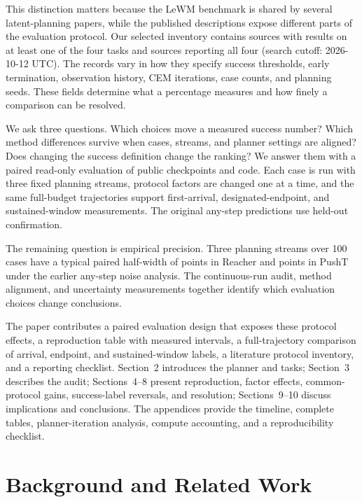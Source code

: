 \documentclass[manuscript,screen,review]{jair}
\begin{document}
This distinction matters because the LeWM benchmark is shared by several latent-planning papers, while the published descriptions expose different parts of the evaluation protocol. Our selected inventory contains \PublicSourceCount{} sources with results on at least one of the four tasks and \FourTaskSourceCount{} sources reporting all four (search cutoff: 2026-10-12 UTC). The records vary in how they specify success thresholds, early termination, observation history, CEM iterations, case counts, and planning seeds. These fields determine what a percentage measures and how finely a comparison can be resolved.

We ask three questions. Which choices move a measured success number? Which method differences survive when cases, streams, and planner settings are aligned? Does changing the success definition change the ranking? We answer them with a paired read-only evaluation of public checkpoints and code. Each case is run with three fixed planning streams, protocol factors are changed one at a time, and the same full-budget trajectories support first-arrival, designated-endpoint, and sustained-window measurements. The original any-step predictions use held-out confirmation.

The remaining question is empirical precision. Three planning streams over 100 cases have a typical paired half-width of \ReacherNoiseHalfwidth{} points in Reacher and \PushTNoiseHalfwidth{} points in PushT under the earlier any-step noise analysis. The continuous-run audit, method alignment, and uncertainty measurements together identify which evaluation choices change conclusions.

The paper contributes a paired evaluation design that exposes these protocol effects, a reproduction table with measured intervals, a full-trajectory comparison of arrival, endpoint, and sustained-window labels, a literature protocol inventory, and a reporting checklist. Section~2 introduces the planner and tasks; Section~3 describes the audit; Sections~4--8 present reproduction, factor effects, common-protocol gains, success-label reversals, and resolution; Sections~9--10 discuss implications and conclusions. The appendices provide the timeline, complete tables, planner-iteration analysis, compute accounting, and a reproducibility checklist.

\section{Background and Related Work}
\end{document}
